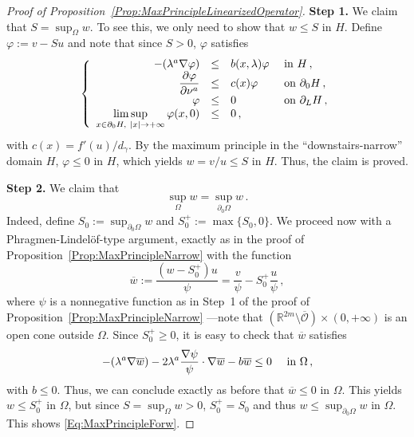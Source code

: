 \documentclass[12pt,reqno]{amsart}
\theoremstyle{definition}
\theoremstyle{remark}
\newcommand{\con}[1]{\mathbb{#1}}
\newcommand{\R}{\con{R}} %
\newcommand{\ocal}{\mathcal{O}}
\newcommand{\s}{\gamma}
\newcommand\beqc[1]{\left\{\begin{array}{#1}}
\newcommand\eeqc{\end{array} \right.}
\def\PDEsystem{rcll}
\let\div\relax
\DeclareMathOperator{\div}{div}
\def\ds{\displaystyle}
\numberwithin{equation}{section}
\begin{document}
\begin{proof}[Proof of Proposition~\ref{Prop:MaxPrincipleLinearizedOperator}]
\textbf{Step 1.}
We claim that $S = \sup_\Omega w$. To see this, we only need to show that $w \leq S$ in $H$. Define $\varphi := v -Su$ and note that since $S>0$, $\varphi$ satisfies 
$$
\beqc{\PDEsystem}
-\div(\lambda^a \nabla \varphi) &\leq& b(x,\lambda) \varphi & \text{ in } H \,, \\
\dfrac{\partial \varphi}{\partial \nu^a}  &\leq & c(x) \varphi & \text{ on } \partial_0 H \,, \\
\varphi & \leq & 0 & \text{ on } \partial_L H  \,,\\
\ds \limsup_{x \in \partial_0 H,\ |x|\to +\infty} \varphi(x,0) & \leq & 0\,,
\eeqc
$$
with $c(x) = f'(u) / d_\s$. By the maximum principle in the ``downstairs-narrow'' domain $H$, $\varphi \leq 0$ in $H$, which yields $w = v/u \leq S$ in $H$. Thus, the claim is proved.

\textbf{Step 2.}
We claim that
\begin{equation}
\label{Eq:MaxPrincipleForw}
\sup_{\Omega} w = \sup_{\partial_0\Omega} w\,.
\end{equation}
Indeed, define $S_0 := \sup_{\partial_0\Omega} w$ and $S_0^+ := \max \{S_0,0\}$. We proceed now with a Phragmen-Lindelöf-type argument, exactly as in the proof of Proposition~\ref{Prop:MaxPrincipleNarrow} with the function
$$
\overline{w} := \dfrac{(w - S_0^+)u}{\psi} = \dfrac{v}{\psi} -S_0^+\dfrac{u}{\psi} \,,
$$
where $\psi$ is a nonnegative function as in Step~1 of the proof of Proposition~\ref{Prop:MaxPrincipleNarrow} ---note that $(\R^{2m}\setminus \overline{\ocal})\times (0,+\infty)$ is an open cone outside $\Omega$. Since $S_0^+\geq 0$, it is easy to check that $\overline{w}$ satisfies
$$
-\div(\lambda^a \nabla \overline{w}) - 2 \lambda^a \dfrac{\nabla \psi}{\psi}\cdot \nabla \overline{w} - b \overline{w} \leq 0 \quad \text{ in } \Omega\,,
$$
with $b \leq 0$. Thus, we can conclude exactly as before that $\overline{w} \leq 0$ in $\Omega$. This yields $w\leq S_0^+$ in $\Omega$, but since $S = \sup_{\Omega} w > 0$, $S_0^+ = S_0$ and thus $w\leq \sup_{\partial_0\Omega} w$ in $\Omega$. This shows \eqref{Eq:MaxPrincipleForw}.




\end{proof}
\end{document}
